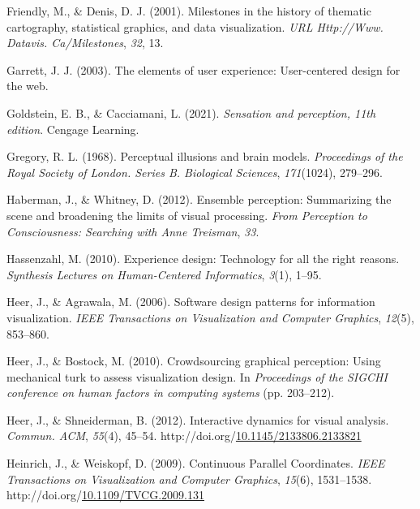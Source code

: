 \documentclass[print]{nuthesis}
\newlength{\cslhangindent}
\newenvironment{CSLReferences}[2]%
{\setlength{\parindent}{0pt}%
\everypar{\setlength{\hangindent}{\cslhangindent}}\ignorespaces}%
{\par}
\begin{document}
\begin{CSLReferences}{1}{0}
\leavevmode{}%
Friendly, M., \& Denis, D. J. (2001). Milestones in the history of thematic cartography, statistical graphics, and data visualization. \emph{URL Http://Www. Datavis. Ca/Milestones}, \emph{32}, 13.

\leavevmode{}%
Garrett, J. J. (2003). The elements of user experience: User-centered design for the web.

\leavevmode{}%
Goldstein, E. B., \& Cacciamani, L. (2021). \emph{Sensation and perception, 11th edition}. Cengage Learning.

\leavevmode{}%
Gregory, R. L. (1968). Perceptual illusions and brain models. \emph{Proceedings of the Royal Society of London. Series B. Biological Sciences}, \emph{171}(1024), 279--296.

\leavevmode{}%
Haberman, J., \& Whitney, D. (2012). Ensemble perception: Summarizing the scene and broadening the limits of visual processing. \emph{From Perception to Consciousness: Searching with Anne Treisman}, \emph{33}.

\leavevmode{}%
Hassenzahl, M. (2010). Experience design: Technology for all the right reasons. \emph{Synthesis Lectures on Human-Centered Informatics}, \emph{3}(1), 1--95.

\leavevmode{}%
Heer, J., \& Agrawala, M. (2006). Software design patterns for information visualization. \emph{IEEE Transactions on Visualization and Computer Graphics}, \emph{12}(5), 853--860.

\leavevmode{}%
Heer, J., \& Bostock, M. (2010). Crowdsourcing graphical perception: Using mechanical turk to assess visualization design. In \emph{Proceedings of the SIGCHI conference on human factors in computing systems} (pp. 203--212).

\leavevmode{}%
Heer, J., \& Shneiderman, B. (2012). Interactive dynamics for visual analysis. \emph{Commun. ACM}, \emph{55}(4), 45--54. http://doi.org/\href{https://doi.org/10.1145/2133806.2133821}{10.1145/2133806.2133821}

\leavevmode{}%
Heinrich, J., \& Weiskopf, D. (2009). {Continuous Parallel Coordinates}. \emph{IEEE Transactions on Visualization and Computer Graphics}, \emph{15}(6), 1531--1538. http://doi.org/\href{https://doi.org/10.1109/TVCG.2009.131}{10.1109/TVCG.2009.131}


\end{CSLReferences}
\end{document}
